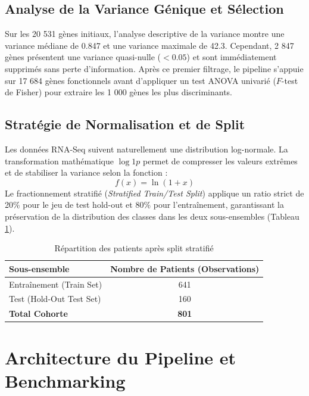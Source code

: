 \documentclass[12pt,a4paper]{report}
\let\oldchapter\chapter
\renewcommand{\chapter}{\clearpage\oldchapter}
\begin{document}
\section{Analyse de la Variance G\'enique et S\'election}
Sur les 20 531 g\`enes initiaux, l'analyse descriptive de la variance montre une variance m\'ediane de 0.847 et une variance maximale de 42.3. Cependant, 2 847 g\`enes pr\'esentent une variance quasi-nulle ($< 0.05$) et sont imm\'ediatement supprim\'es sans perte d'information. Apr\`es ce premier filtrage, le pipeline s'appuie sur 17 684 g\`enes fonctionnels avant d'appliquer un test ANOVA univari\'e ($F$-test de Fisher) pour extraire les 1 000 g\`enes les plus discriminants.

\section{Strat\'egie de Normalisation et de Split}
Les donn\'ees RNA-Seq suivent naturellement une distribution log-normale. La transformation math\'ematique $\log1p$ permet de compresser les valeurs extr\^emes et de stabiliser la variance selon la fonction :
\begin{equation}
f(x) = \ln(1 + x)
\end{equation}
Le fractionnement stratifi\'e (\textit{Stratified Train/Test Split}) applique un ratio strict de 20\% pour le jeu de test hold-out et 80\% pour l'entra\^inement, garantissant la pr\'eservation de la distribution des classes dans les deux sous-ensembles (Tableau \ref{tab:split}).

\begin{table}[H]
\centering
\caption{R\'epartition des patients apr\`es split stratifi\'e}
\label{tab:split}
\begin{tabular}{lc}
\toprule
\textbf{Sous-ensemble} & \textbf{Nombre de Patients (Observations)} \\
\midrule
Entra\^inement (Train Set) & 641 \\
Test (Hold-Out Test Set) & 160 \\
\midrule
\textbf{Total Cohorte} & \textbf{801} \\
\bottomrule
\end{tabular}
\end{table}

\chapter{Architecture du Pipeline et Benchmarking}
\end{document}
